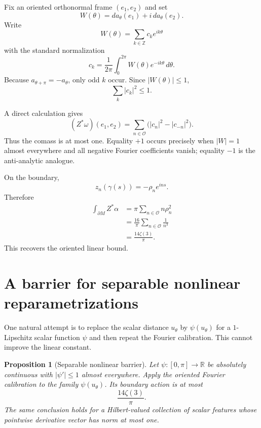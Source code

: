 \documentclass[11pt]{article}
\newtheorem{proposition}[theorem]{Proposition}
\newcommand{\R}{\mathbb R}
\newcommand{\Z}{\mathbb Z}
\begin{document}
Fix an oriented orthonormal frame $(e_1,e_2)$ and set
\[
        W(\theta)
        =da_\theta(e_1)+i\,da_\theta(e_2).
\]
Write
\[
        W(\theta)=\sum_{k\in\Z}c_ke^{ik\theta}
\]
with the standard normalization
\[
        c_k=\frac1{2\pi}\int_0^{2\pi}
             W(\theta)e^{-ik\theta}\,d\theta.
\]
Because $a_{\theta+\pi}=-a_\theta$, only odd $k$ occur.  Since
$|W(\theta)|\le1$,
\[
        \sum_k|c_k|^2\le1.
\]

A direct calculation gives
\begin{equation}\label{eq:base-density}
 \boxed{
 (Z^*\omega)(e_1,e_2)
 =
 \sum_{n\in\mathcal O}
 \bigl(|c_n|^2-|c_{-n}|^2\bigr).}
\end{equation}
Thus the comass is at most one.  Equality $+1$ occurs precisely when
$|W|=1$ almost everywhere and all negative Fourier coefficients vanish;
equality $-1$ is the anti-analytic analogue.

On the boundary,
\[
        z_n(\gamma(s))=-\rho_ne^{ins}.
\]
Therefore
\[
\begin{aligned}
 \int_{\partial M}Z^*\alpha
 &=
 \pi\sum_{n\in\mathcal O}n\rho_n^2\\
 &=
 \frac{16}{\pi}\sum_{n\in\mathcal O}\frac1{n^3}\\
 &=
 \frac{14\zeta(3)}{\pi}.
\end{aligned}
\]
This recovers the oriented linear bound.

\section{A barrier for separable nonlinear reparametrizations}

One natural attempt is to replace the scalar distance $u_\theta$ by
$\psi(u_\theta)$ for a $1$-Lipschitz scalar function $\psi$ and then repeat
the Fourier calibration.  This cannot improve the linear constant.

\begin{proposition}[Separable nonlinear barrier]\label{prop:separable}
Let $\psi:[0,\pi]\to\R$ be absolutely continuous with
$|\psi'|\le1$ almost everywhere.  Apply the oriented Fourier calibration
to the family $\psi(u_\theta)$.  Its boundary action is at most
\[
        \frac{14\zeta(3)}{\pi}.
\]
The same conclusion holds for a Hilbert-valued collection of scalar
features whose pointwise derivative vector has norm at most one.
\end{proposition}
\end{document}
